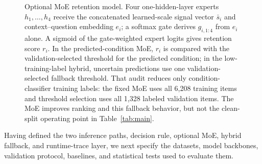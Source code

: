 \documentclass{ieeeaccess}
\begin{document}
\begin{figure}[t]
\centering
{}
\def\xfigwd{\columnwidth}
\caption{Optional MoE retention model. Four one-hidden-layer experts $h_1,\ldots,h_4$ receive the concatenated learned-scale signal vector $\bar{s}_i$ and context--question embedding $e_i$; a softmax gate derives $g_{i,1:4}$ from $e_i$ alone. A sigmoid of the gate-weighted expert logits gives retention score $r_i$. In the predicted-condition MoE, $r_i$ is compared with the validation-selected threshold for the predicted condition; in the low-training-label hybrid, uncertain predictions use one validation-selected fallback threshold. That audit reduces only condition-classifier training labels: the fixed MoE uses all 6,208 training items and threshold selection uses all 1,328 labeled validation items. The MoE improves ranking and this fallback behavior, but not the clean-split operating point in Table~\ref{tab:main}.}
\label{fig:moe}
\end{figure}

Having defined the two inference paths, decision rule, optional MoE, hybrid fallback, and runtime-trace layer, we next specify the datasets, model backbones, validation protocol, baselines, and statistical tests used to evaluate them.
\end{document}
